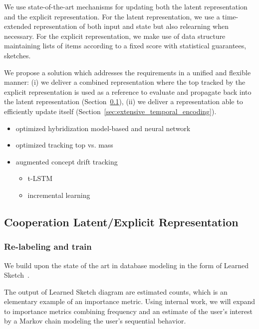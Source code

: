 We use state-of-the-art mechanisms for updating both the latent representation and the explicit representation. For the latent representation, we use a time-extended representation of both input and state but also relearning when necessary. For the explicit representation, we make use of data structure maintaining lists of items according to a fixed score with statistical guarantees, sketches.

We propose a solution which addresses the requirements in a unified and flexible manner:
(i) we deliver a combined representation where the top tracked by the explicit representation is used as a reference to evaluate and propagate back into the latent representation (Section~\ref{sec:cooperation_latent_explicit_representation}),
(ii) we deliver a representation able to efficiently update itself (Section~\ref{sec:extensive_temporal_encoding}).

\begin{itemize}
  \item optimized hybridization model-based and neural network
  \item optimized tracking top vs. mass
  \item augmented concept drift tracking
  \begin{itemize}
    \item t-LSTM 
    \item incremental learning
  \end{itemize}
\end{itemize}


\subsection{Cooperation Latent/Explicit Representation}
\label{sec:cooperation_latent_explicit_representation}

\subsubsection{Re-labeling and train}

We build upon the state of the art in database modeling in the form of Learned Sketch~\cite{hsu2019learning}.

The output of Learned Sketch diagram are estimated counts, which is an elementary example of an importance metric. Using internal work, we will expand to importance metrics combining frequency and an estimate of the user's interest by a Markov chain modeling the user's sequential behavior.

